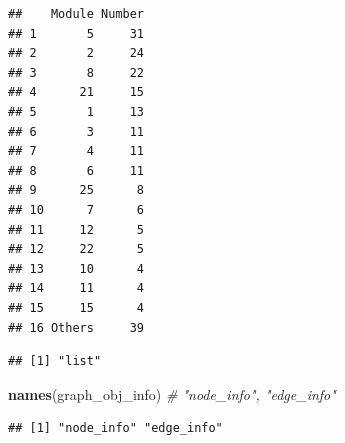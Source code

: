 \documentclass[
]{book}
\newenvironment{Shaded}{\begin{snugshade}}{\end{snugshade}}
\newcommand{\AttributeTok}[1]{\textcolor[rgb]{0.13,0.29,0.53}{#1}}
\newcommand{\CommentTok}[1]{\textcolor[rgb]{0.56,0.35,0.01}{\textit{#1}}}
\newcommand{\FunctionTok}[1]{\textcolor[rgb]{0.13,0.29,0.53}{\textbf{#1}}}
\newcommand{\NormalTok}[1]{#1}
\newcommand{\OtherTok}[1]{\textcolor[rgb]{0.56,0.35,0.01}{#1}}
\newcommand{\SpecialCharTok}[1]{\textcolor[rgb]{0.81,0.36,0.00}{\textbf{#1}}}
\begin{document}
\begin{verbatim}
##    Module Number
## 1       5     31
## 2       2     24
## 3       8     22
## 4      21     15
## 5       1     13
## 6       3     11
## 7       4     11
## 8       6     11
## 9      25      8
## 10      7      6
## 11     12      5
## 12     22      5
## 13     10      4
## 14     11      4
## 15     15      4
## 16 Others     39
\end{verbatim}

\begin{Shaded}
\end{Shaded}

\begin{verbatim}
## [1] "list"
\end{verbatim}

\begin{Shaded}
\begin{Highlighting}[]
\FunctionTok{names}\NormalTok{(graph\_obj\_info)         }\CommentTok{\# "node\_info", "edge\_info"}
\end{Highlighting}
\end{Shaded}

\begin{verbatim}
## [1] "node_info" "edge_info"
\end{verbatim}

\begin{Shaded}
\end{Shaded}
\end{document}
